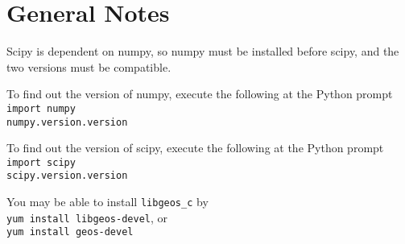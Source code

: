 \documentclass[a4paper, 12pt]{article}
\begin{document}
%
\section{General Notes}

Scipy is dependent on numpy, so numpy must be installed before
scipy, and the two versions must be compatible.

To find out the version of numpy, execute the following at the Python prompt \\
\texttt{import numpy} \\
\texttt{numpy.version.version}

To find out the version of scipy, execute the following at the Python prompt \\
\texttt{import scipy} \\
\texttt{scipy.version.version}

You may be able to install \texttt{libgeos\_c} by \\
\texttt{yum install libgeos-devel}, or \\
\texttt{yum install geos-devel}
\end{document}
